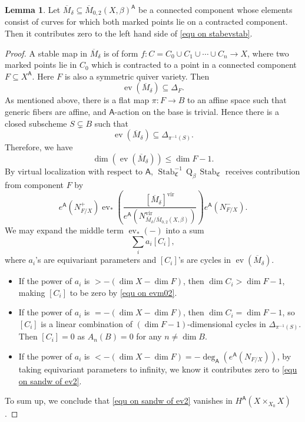 \documentclass[10pt]{amsart}
\theoremstyle{definition}
\newtheorem{Lemma}[Theorem]{Lemma}
\numberwithin{equation}{section}
\newcommand{\sQ}{\mathrm{Q}}
\newcommand{\fC}{\mathfrak{C}}
\newcommand{\vir}{\mathrm{vir}}
\newcommand{\sA}{\mathsf{A}}
\newcommand{\ev}{\operatorname{ev}}
\newcommand{\Stab}{\operatorname{Stab}}
\begin{document}
\begin{Lemma}\label{lem on vani of delta cpn}
Let $\overline{M}_{\delta}\subseteq \overline{M}_{0,2}(X,\beta)^{\sA}$ be a connected component 
whose elements consist of curves for which both marked points lie
on a contracted component.
Then it contributes zero to the left hand side of \eqref{equ on stabevstab}. 
\end{Lemma}
\begin{proof}
A stable map in $\overline{M}_{\delta}$ is of form $f\colon C=C_0\cup C_1\cup\cdots\cup C_n\to X$, where two marked points lie in $C_0$ which is contracted to a point in a connected component $F\subseteq X^\sA$. Here $F$ is also a symmetric quiver variety. Then 
$$\ev(\overline{M}_{\delta})\subseteq \Delta_F. $$
As mentioned above, there is a flat map $\pi\colon F\to B$ to an affine space such that generic fibers are affine, and 
$\sA$-action on the base is trivial. Hence 
there is a closed subscheme $S\subsetneq B$ such that 
\begin{equation}\ev(\overline{M}_{\delta})\subseteq \Delta_{ \pi^{-1}(S)}.  \nonumber \end{equation}
Therefore, we have 
\begin{equation}\label{equ on evm02}\dim(\ev(\overline{M}_{\delta}))\leqslant \dim F-1. \end{equation}
By virtual localization \cite{GP} with respect to $\sA$, 
$\Stab_\fC^{-1}\, \sQ_\beta\, \Stab_\fC$ receives contribution from component $F$ by 
\begin{equation}\label{equ on sandw of ev2}e^{\sA}\left(N_{F/X}^+\right)\ev_*\left(\frac{[\overline{M}_{\delta}]^{\vir}}{e^{\sA}\left(N^{\vir}_{\overline{M}_{\delta}/\overline{M}_{0,2}(X,\beta)}\right)} \right)e^{\sA}\left(N_{F/X}^-\right). \end{equation}
We may expand the middle term $\ev_*(-)$ into a sum 
$$\sum_{i}a_i[C_i], $$ 
where $a_i$'s are equivariant parameters and $[C_i]$'s are cycles in $\ev(\overline{M}_{\delta})$.  
\begin{itemize} 
\item If the power of $a_i$ is $>-(\dim X-\dim F)$, then $\dim C_i> \dim F-1$, making $[C_i]$ to be zero by \eqref{equ on evm02}. 
\item If the power of $a_i$ is $=-(\dim X-\dim F)$, then $\dim C_i= \dim F-1$, so $[C_i]$ is a linear combination of $(\dim F-1)$-dimensional 
cycles in $\Delta_{ \pi^{-1}(S)}$. Then $[C_i]=0$ as $A_{n}(B)=0$ for any $n\neq \dim B$.
\item If the power of $a_i$ is $<-(\dim X-\dim F)=-\deg_{\sA} (e^{\sA}(N_{F/X}))$, by taking equivariant parameters to infinity, 
we know it contributes zero to \eqref{equ on sandw of ev2}.
\end{itemize} 
To sum up, we conclude that \eqref{equ on sandw of ev2} vanishes in $H^\sA(X\times_{X_0}X)$.
\end{proof}
\end{document}
